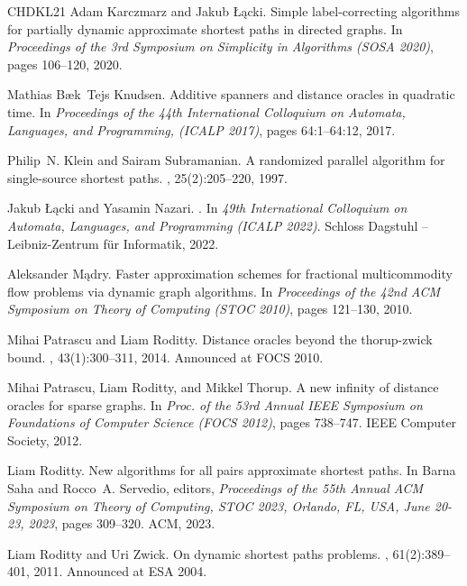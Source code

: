 \documentclass[11pt]{article}
\theoremstyle{definition}
\theoremstyle{remark}
\begin{document}
\begin{thebibliography}{CHDKL21}
Adam Karczmarz and Jakub {\L}ącki.
\newblock Simple label-correcting algorithms for partially dynamic approximate
  shortest paths in directed graphs.
\newblock In {\em Proceedings of the 3rd Symposium on Simplicity in Algorithms
  ({SOSA} 2020)}, pages 106--120, 2020.

Mathias B{\ae}k~Tejs Knudsen.
\newblock Additive spanners and distance oracles in quadratic time.
\newblock In {\em Proceedings of the 44th International Colloquium on Automata,
  Languages, and Programming, ({ICALP} 2017)}, pages 64:1--64:12, 2017.

Philip~N. Klein and Sairam Subramanian.
\newblock A randomized parallel algorithm for single-source shortest paths.
, 25(2):205--220, 1997.

Jakub {\L}ącki and Yasamin Nazari.
.
\newblock In {\em 49th International Colloquium on Automata, Languages, and
  Programming (ICALP 2022)}. Schloss Dagstuhl -- Leibniz-Zentrum f{\"u}r
  Informatik, 2022.

Aleksander Mądry.
\newblock Faster approximation schemes for fractional multicommodity flow
  problems via dynamic graph algorithms.
\newblock In {\em Proceedings of the 42nd {ACM} Symposium on Theory of
  Computing (STOC 2010)}, pages 121--130, 2010.

Mihai Patrascu and Liam Roditty.
\newblock Distance oracles beyond the thorup-zwick bound.
, 43(1):300--311, 2014.
\newblock Announced at {FOCS} 2010.

Mihai Patrascu, Liam Roditty, and Mikkel Thorup.
\newblock A new infinity of distance oracles for sparse graphs.
\newblock In {\em Proc. of the 53rd Annual {IEEE} Symposium on Foundations of
  Computer Science ({FOCS} 2012)}, pages 738--747. {IEEE} Computer Society,
  2012.

Liam Roditty.
\newblock New algorithms for all pairs approximate shortest paths.
\newblock In Barna Saha and Rocco~A. Servedio, editors, {\em Proceedings of the
  55th Annual {ACM} Symposium on Theory of Computing, {STOC} 2023, Orlando, FL,
  USA, June 20-23, 2023}, pages 309--320. {ACM}, 2023.

Liam Roditty and Uri Zwick.
\newblock On dynamic shortest paths problems.
, 61(2):389--401, 2011.
\newblock Announced at {ESA} 2004.


\end{thebibliography}
\end{document}
